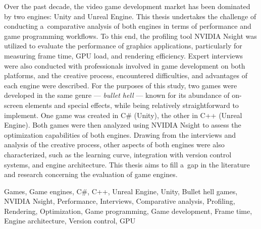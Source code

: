 \documentclass[
    bindingoffset=5mm,  %
    footnoteindent=3mm, %
    hyphenation=true    %
]{src/wut-thesis}
\begin{document}
\clearpage
\secondabstract 
Over the past decade, the video game development market has been dominated by two engines: Unity and 
Unreal Engine. This thesis undertakes the challenge of conducting a~comparative analysis of both 
engines in terms of performance and game programming workflows. To this end, the profiling tool NVIDIA 
Nsight was utilized to evaluate the performance of graphics applications, particularly for measuring 
frame time, GPU load, and rendering efficiency. Expert interviews were also conducted with professionals 
involved in game development on both platforms, and the creative process, encountered difficulties, 
and advantages of each engine were described. For the purposes of this study, two games were developed 
in the same genre --- \emph{bullet hell} --- known for its abundance of on-screen elements and special 
effects, while being relatively straightforward to implement. One game was created in C\# (Unity), the 
other in C++ (Unreal Engine). Both games were then analyzed using NVIDIA Nsight to assess the 
optimization capabilities of both engines. Drawing from the interviews and analysis of the creative 
process, other aspects of both engines were also characterized, such as the learning curve, integration 
with version control systems, and engine architecture. This thesis aims to fill a~gap in the literature 
and research concerning the evaluation of game engines.

\secondkeywords Games, Game engines, C\#, C++, Unreal Engine, Unity, Bullet hell games, NVIDIA Nsight, 
Performance, Interviews, Comparative analysis, Profiling, Rendering, Optimization, Game programming, 
Game development, Frame time, Engine architecture, Version control, GPU

\pagestyle{plain}

\cleardoublepage %
\tableofcontents

\cleardoublepage %
\pagestyle{headings}

  
        
\end{document}
